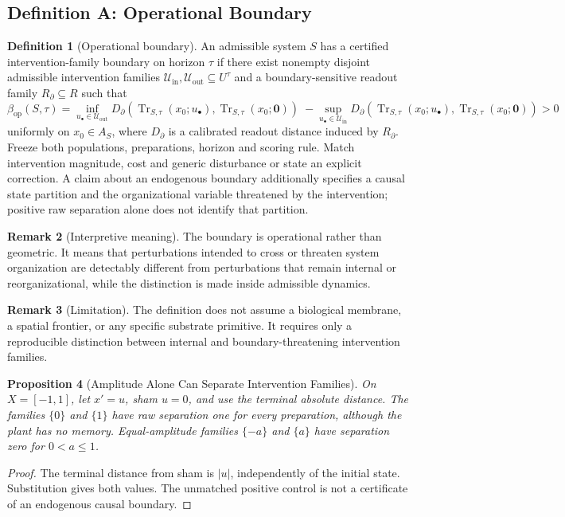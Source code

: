 \documentclass[11pt,a4paper]{article}
\newtheorem{proposition}{Proposition}[section]
\theoremstyle{definition}
\newtheorem{definition}[proposition]{Definition}
\newtheorem{remark}[proposition]{Remark}
\newcommand{\Aset}{A_S}
\newcommand{\Bound}{\beta_{\mathrm{op}}}
\newcommand{\trace}{\operatorname{Tr}}
\begin{document}
\subsection{Definition A: Operational Boundary}
\begin{definition}[Operational boundary]\label{def:operational-boundary}
An admissible system $S$ has a certified intervention-family boundary on horizon $\tau$ if there exist nonempty disjoint admissible intervention families $\mathcal{U}_{\mathrm{in}},\mathcal{U}_{\mathrm{out}} \subseteq U^\tau$ and a boundary-sensitive readout family $R_{\partial}\subseteq R$ such that
\[
\Bound(S,\tau)
=
\inf_{u_\bullet\in\mathcal{U}_{\mathrm{out}}}
D_{\partial}\!\left(\trace_{S,\tau}(x_0;u_\bullet),\trace_{S,\tau}(x_0;\mathbf{0})\right)
\;-
\sup_{u_\bullet\in\mathcal{U}_{\mathrm{in}}}
D_{\partial}\!\left(\trace_{S,\tau}(x_0;u_\bullet),\trace_{S,\tau}(x_0;\mathbf{0})\right)
>0
\]
uniformly on $x_0\in\Aset$, where $D_{\partial}$ is a calibrated readout distance induced by $R_{\partial}$. Freeze both populations, preparations, horizon and scoring rule. Match intervention magnitude, cost and generic disturbance or state an explicit correction. A claim about an endogenous boundary additionally specifies a causal state partition and the organizational variable threatened by the intervention; positive raw separation alone does not identify that partition.
\end{definition}

\begin{remark}[Interpretive meaning]
The boundary is operational rather than geometric. It means that perturbations intended to cross or threaten system organization are detectably different from perturbations that remain internal or reorganizational, while the distinction is made inside admissible dynamics.
\end{remark}

\begin{remark}[Limitation]
The definition does not assume a biological membrane, a spatial frontier, or any specific substrate primitive. It requires only a reproducible distinction between internal and boundary-threatening intervention families.
\end{remark}

\begin{proposition}[Amplitude Alone Can Separate Intervention Families]\label{prop:boundary-amplitude-control}
On $X=[-1,1]$, let $x'=u$, sham $u=0$, and use the terminal absolute distance. The families $\{0\}$ and $\{1\}$ have raw separation one for every preparation, although the plant has no memory. Equal-amplitude families $\{-a\}$ and $\{a\}$ have separation zero for $0<a\le1$.
\end{proposition}
\begin{proof}
The terminal distance from sham is $|u|$, independently of the initial state. Substitution gives both values. The unmatched positive control is not a certificate of an endogenous causal boundary.
\end{proof}
\end{document}
